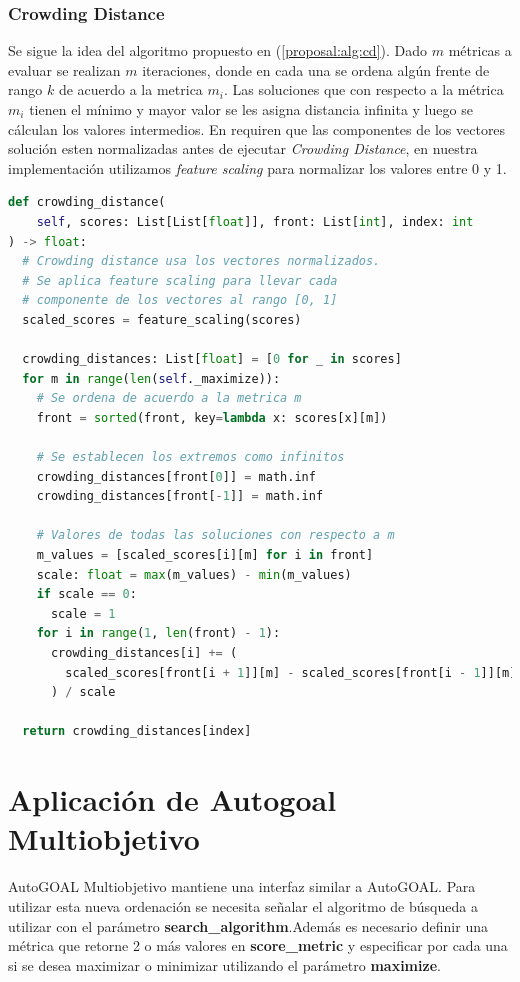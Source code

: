 \subsubsection{Crowding Distance}
Se sigue la idea del algoritmo propuesto en (\ref{proposal:alg:cd}). Dado $m$ m\'etricas a evaluar se realizan $m$ iteraciones, donde en cada una se ordena alg\'un frente de rango $k$ de acuerdo a la metrica $m_i$. Las soluciones que con respecto a la m\'etrica $m_i$ tienen el m\'inimo y mayor valor se les asigna distancia infinita y luego se c\'alculan los valores intermedios. En \cite{deb2002fast} requiren que las componentes de los vectores soluci\'on esten normalizadas antes de ejecutar \textit{Crowding Distance}, en nuestra implementaci\'on utilizamos \textit{feature scaling} para normalizar los valores entre 0 y 1.

\begin{lstlisting}[caption=Crowding Distance Sorting, language=Python]
def crowding_distance(
    self, scores: List[List[float]], front: List[int], index: int
) -> float:
  # Crowding distance usa los vectores normalizados.
  # Se aplica feature scaling para llevar cada
  # componente de los vectores al rango [0, 1]
  scaled_scores = feature_scaling(scores)

  crowding_distances: List[float] = [0 for _ in scores]
  for m in range(len(self._maximize)):
    # Se ordena de acuerdo a la metrica m
    front = sorted(front, key=lambda x: scores[x][m])

    # Se establecen los extremos como infinitos
    crowding_distances[front[0]] = math.inf
    crowding_distances[front[-1]] = math.inf

    # Valores de todas las soluciones con respecto a m 
    m_values = [scaled_scores[i][m] for i in front]
    scale: float = max(m_values) - min(m_values)
    if scale == 0:
      scale = 1
    for i in range(1, len(front) - 1):
      crowding_distances[i] += (
        scaled_scores[front[i + 1]][m] - scaled_scores[front[i - 1]][m]
      ) / scale

  return crowding_distances[index]
\end{lstlisting}

\section{Aplicaci\'on de Autogoal Multiobjetivo}
AutoGOAL Multiobjetivo mantiene una interfaz similar a AutoGOAL. Para utilizar esta nueva ordenaci\'on se necesita  se\~nalar el algoritmo de b\'usqueda a utilizar con el par\'ametro \textbf{search\_algorithm}.Adem\'as es necesario definir una m\'etrica que retorne 2 o m\'as valores en \textbf{score\_metric} y especificar por cada una si se desea maximizar o minimizar utilizando el par\'ametro  \textbf{maximize}. 

